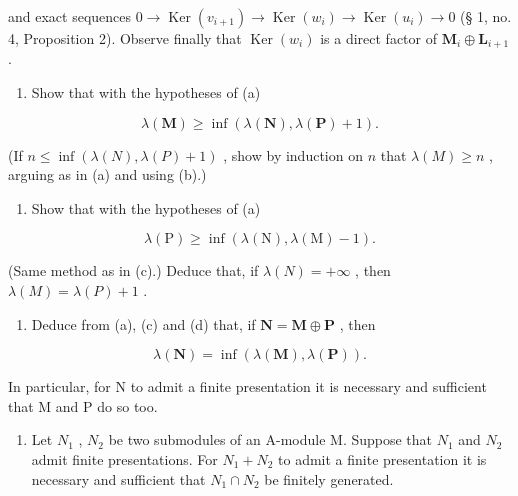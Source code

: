 and exact sequences \(0 \to \operatorname{Ker}(v_{i+1}) \to \operatorname{Ker}(w_i) \to \operatorname{Ker}(u_i) \to 0\) (§ 1, no. 4, Proposition 2). Observe finally that \(\operatorname{Ker}(w_i)\) is a direct factor of \(\mathbf{M}_i \oplus \mathbf{L}_{i+1}\) .

\begin{enumerate}
\def\labelenumi{(\alph{enumi})}
\setcounter{enumi}{2}
\tightlist
\item
  Show that with the hypotheses of (a)
\end{enumerate}

\[
\lambda (\mathbf {M}) \geqslant \inf (\lambda (\mathbf {N}), \lambda (\mathbf {P}) + 1).
\]

(If \(n \leqslant \inf(\lambda(N), \lambda(P) + 1)\) , show by induction on \(n\) that \(\lambda(M) \geqslant n\) , arguing as in (a) and using (b).)

\begin{enumerate}
\def\labelenumi{(\alph{enumi})}
\setcounter{enumi}{3}
\tightlist
\item
  Show that with the hypotheses of (a)
\end{enumerate}

\[
\lambda (\mathrm{P}) \geqslant \inf (\lambda (\mathrm{N}), \lambda (\mathrm{M}) - 1).
\]

(Same method as in (c).) Deduce that, if \(\lambda(N) = +\infty\) , then \(\lambda(M) = \lambda(P) + 1\) .

\begin{enumerate}
\def\labelenumi{(\alph{enumi})}
\setcounter{enumi}{4}
\tightlist
\item
  Deduce from (a), (c) and (d) that, if \(\mathbf{N} = \mathbf{M} \oplus \mathbf{P}\) , then
\end{enumerate}

\[
\lambda (\mathbf {N}) = \inf (\lambda (\mathbf {M}), \lambda (\mathbf {P})).
\]

In particular, for N to admit a finite presentation it is necessary and sufficient that M and P do so too.

\begin{enumerate}
\def\labelenumi{(\alph{enumi})}
\setcounter{enumi}{5}
\tightlist
\item
  Let \(N_{1}\) , \(N_{2}\) be two submodules of an A-module M. Suppose that \(N_{1}\) and \(N_{2}\) admit finite presentations. For \(N_{1} + N_{2}\) to admit a finite presentation it is necessary and sufficient that \(N_{1} \cap N_{2}\) be finitely generated.
\end{enumerate}


